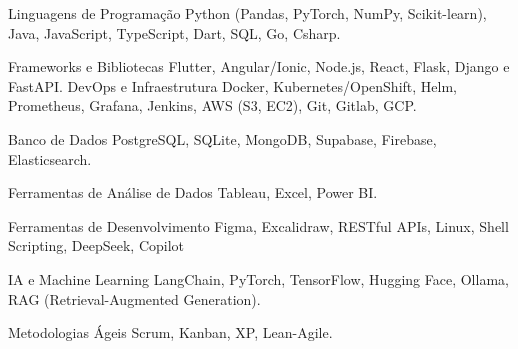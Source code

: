 

\begin{cvskills}

  \cvskill
    {Linguagens de Programação} %
    {Python (Pandas, PyTorch, NumPy, Scikit-learn), Java, JavaScript, TypeScript, Dart, SQL, Go, Csharp.} %

  \cvskill
    {Frameworks e Bibliotecas} %
    {Flutter, Angular/Ionic, Node.js, React, Flask, Django e FastAPI.} %
  \cvskill
    {DevOps e Infraestrutura} %
    {Docker, Kubernetes/OpenShift, Helm, Prometheus, Grafana, Jenkins, AWS (S3, EC2), Git, Gitlab, GCP.} %

  \cvskill
    {Banco de Dados} %
    {PostgreSQL, SQLite, MongoDB, Supabase, Firebase, Elasticsearch.} %

  \cvskill
    {Ferramentas de Análise de Dados} %
    {Tableau, Excel, Power BI.} %

  \cvskill
    {Ferramentas de Desenvolvimento} %
    {Figma, Excalidraw, RESTful APIs, Linux, Shell Scripting, DeepSeek, Copilot} %

  \cvskill
    {IA e Machine Learning} %
    {LangChain, PyTorch, TensorFlow, Hugging Face, Ollama, RAG (Retrieval-Augmented Generation).} %

    \cvskill
    {Metodologias Ágeis} %
    {Scrum, Kanban, XP, Lean-Agile.} %

\end{cvskills}
